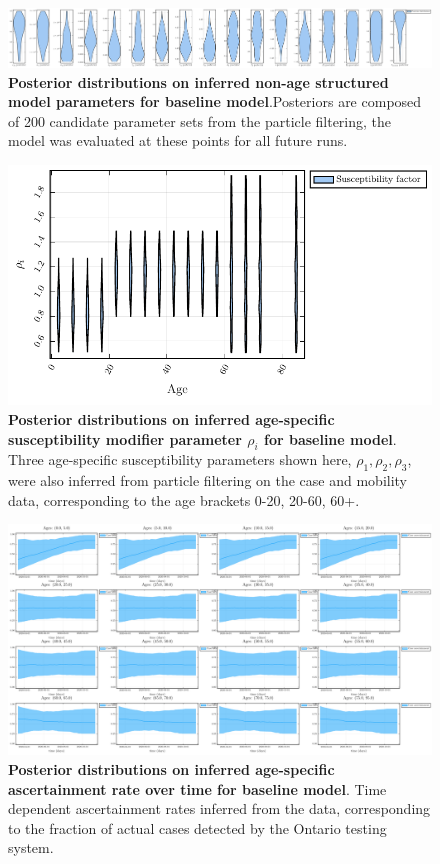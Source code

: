\label{appendix_c}

\begin{figure}[H]
\centering
\includegraphics[width = 18 cm]{appendices/FigureS1.pdf}
\caption{\textbf{Posterior distributions on inferred non-age structured model parameters for baseline model}.Posteriors are composed of 200 candidate parameter sets from the particle filtering, the model was evaluated at these points for all future runs.}
\label{s1}
\end{figure}

\begin{figure}[H]
    \centering
    \includegraphics[width = 12 cm]{appendices/FigureS2.pdf}
    \caption{\textbf{Posterior distributions on inferred age-specific susceptibility modifier parameter $\rho_i$ for baseline model}. Three age-specific susceptibility parameters shown here, $\rho_1,\rho_2,\rho_3$, were also inferred from particle filtering on the case and mobility data, corresponding to the age brackets 0-20, 20-60, 60+.}
    \label{s2}
    \end{figure}
    
    \clearpage 
    
    \begin{figure}[H]
    \centering
    \includegraphics[width = 18 cm]{appendices/FigureS3.pdf}
    \caption{\textbf{Posterior distributions on inferred age-specific ascertainment rate over time for baseline model}. Time dependent ascertainment rates inferred from the data, corresponding to the fraction of actual cases detected by the Ontario testing system. }
    \label{s3}
    \end{figure}
    
